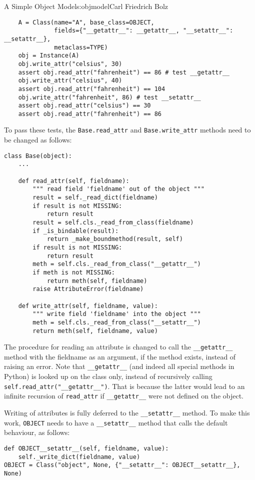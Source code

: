 \begin{aosachapter}{A Simple Object Model}{s:objmodel}{Carl Friedrich Bolz}
\begin{verbatim}
    A = Class(name="A", base_class=OBJECT,
              fields={"__getattr__": __getattr__, "__setattr__": __setattr__},
              metaclass=TYPE)
    obj = Instance(A)
    obj.write_attr("celsius", 30)
    assert obj.read_attr("fahrenheit") == 86 # test __getattr__
    obj.write_attr("celsius", 40)
    assert obj.read_attr("fahrenheit") == 104
    obj.write_attr("fahrenheit", 86) # test __setattr__
    assert obj.read_attr("celsius") == 30
    assert obj.read_attr("fahrenheit") == 86
\end{verbatim}

To pass these tests, the \texttt{Base.read\_attr} and
\texttt{Base.write\_attr} methods need to be changed as follows:

\begin{verbatim}
class Base(object):
    ...

    def read_attr(self, fieldname):
        """ read field 'fieldname' out of the object """
        result = self._read_dict(fieldname)
        if result is not MISSING:
            return result
        result = self.cls._read_from_class(fieldname)
        if _is_bindable(result):
            return _make_boundmethod(result, self)
        if result is not MISSING:
            return result
        meth = self.cls._read_from_class("__getattr__")
        if meth is not MISSING:
            return meth(self, fieldname)
        raise AttributeError(fieldname)

    def write_attr(self, fieldname, value):
        """ write field 'fieldname' into the object """
        meth = self.cls._read_from_class("__setattr__")
        return meth(self, fieldname, value)
\end{verbatim}

The procedure for reading an attribute is changed to call the
\texttt{\_\_getattr\_\_} method with the fieldname as an argument, if
the method exists, instead of raising an error. Note that
\texttt{\_\_getattr\_\_} (and indeed all special methods in Python) is
looked up on the class only, instead of recursively calling
\texttt{self.read\_attr("\_\_getattr\_\_")}. That is because the latter
would lead to an infinite recursion of \texttt{read\_attr} if
\texttt{\_\_getattr\_\_} were not defined on the object.

Writing of attributes is fully deferred to the \texttt{\_\_setattr\_\_}
method. To make this work, \texttt{OBJECT} needs to have a
\texttt{\_\_setattr\_\_} method that calls the default behaviour, as
follows:

\begin{verbatim}
def OBJECT__setattr__(self, fieldname, value):
    self._write_dict(fieldname, value)
OBJECT = Class("object", None, {"__setattr__": OBJECT__setattr__}, None)
\end{verbatim}


\end{aosachapter}
